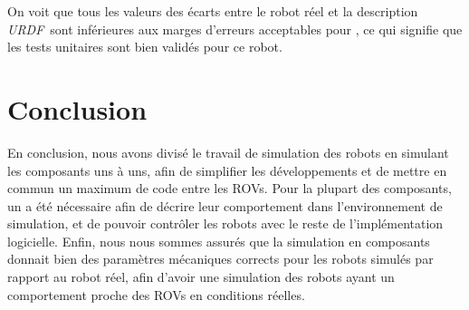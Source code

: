 			On voit que tous les valeurs des écarts entre le robot réel et la description \textit{URDF} sont inférieures aux marges d'erreurs acceptables pour \argos{}, ce qui signifie que les tests unitaires sont bien validés pour ce robot.

	\section{Conclusion}
	
		En conclusion, nous avons divisé le travail de simulation des robots en simulant les composants uns à uns, afin de simplifier les développements et de mettre en commun un maximum de code entre les \gls{ROV}s. Pour la plupart des composants, un \plugin{} \gazebo{} a été nécessaire afin de décrire leur comportement dans l'environnement de simulation, et de pouvoir contrôler les robots avec le reste de l'implémentation logicielle. Enfin, nous nous sommes assurés que la simulation en composants donnait bien des paramètres mécaniques corrects pour les robots simulés par rapport au robot réel, afin d'avoir une simulation des robots ayant un comportement proche des \gls{ROV}s en conditions réelles.
